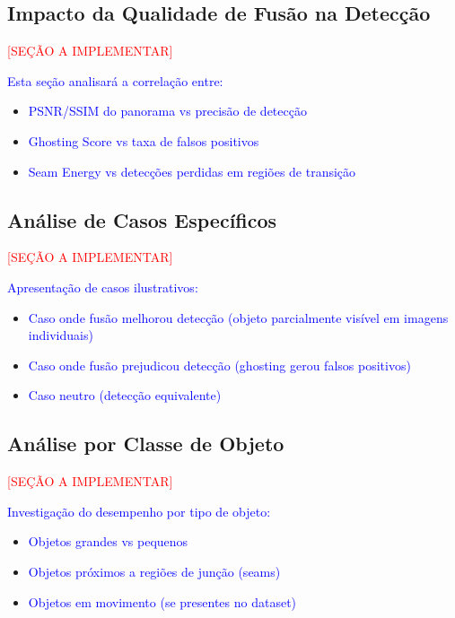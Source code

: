 \subsection{Impacto da Qualidade de Fusão na Detecção}

\textcolor{red}{[SEÇÃO A IMPLEMENTAR]}

\textcolor{blue}{Esta seção analisará a correlação entre:}
\begin{itemize}
    \item \textcolor{blue}{PSNR/SSIM do panorama vs precisão de detecção}
    \item \textcolor{blue}{Ghosting Score vs taxa de falsos positivos}
    \item \textcolor{blue}{Seam Energy vs detecções perdidas em regiões de transição}
\end{itemize}

\subsection{Análise de Casos Específicos}

\textcolor{red}{[SEÇÃO A IMPLEMENTAR]}

\textcolor{blue}{Apresentação de casos ilustrativos:}
\begin{itemize}
    \item \textcolor{blue}{Caso onde fusão melhorou detecção (objeto parcialmente visível em imagens individuais)}
    \item \textcolor{blue}{Caso onde fusão prejudicou detecção (ghosting gerou falsos positivos)}
    \item \textcolor{blue}{Caso neutro (detecção equivalente)}
\end{itemize}


\subsection{Análise por Classe de Objeto}

\textcolor{red}{[SEÇÃO A IMPLEMENTAR]}

\textcolor{blue}{Investigação do desempenho por tipo de objeto:}
\begin{itemize}
    \item \textcolor{blue}{Objetos grandes vs pequenos}
    \item \textcolor{blue}{Objetos próximos a regiões de junção (seams)}
    \item \textcolor{blue}{Objetos em movimento (se presentes no dataset)}
\end{itemize}

